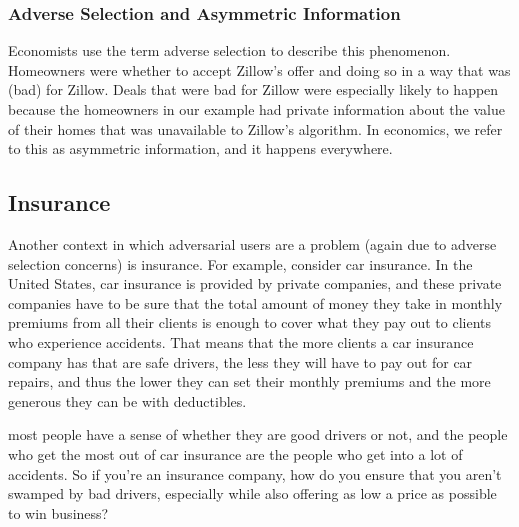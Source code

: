 \documentclass[letterpaper,10pt,english]{jupyterBook}
\begin{document}
\subsubsection{Adverse Selection and Asymmetric Information}
\label{\detokenize{30_questions/29_passive_external_adversarial_users_examples:adverse-selection-and-asymmetric-information}}
\sphinxAtStartPar
Economists use the term adverse selection to describe this phenomenon. Homeowners were  whether to accept Zillow’s offer and doing so in a way that was  (bad) for Zillow. Deals that were bad for Zillow were especially likely to happen because the homeowners in our example had private information about the value of their homes that was unavailable to Zillow’s algorithm. In economics, we refer to this as asymmetric information, and it happens everywhere.


\subsection{Insurance}
\label{\detokenize{30_questions/29_passive_external_adversarial_users_examples:insurance}}
\sphinxAtStartPar
Another context in which adversarial users are a problem (again due to adverse selection concerns) is insurance. For example, consider car insurance. In the United States, car insurance is provided by private companies, and these private companies have to be sure that the total amount of money they take in monthly premiums from all their clients is enough to cover what they pay out to clients who experience accidents. That means that the more clients a car insurance company has that are safe drivers, the less they will have to pay out for car repairs, and thus the lower they can set their monthly premiums and the more generous they can be with deductibles.

\sphinxAtStartPar
{} most people have a sense of whether they are good drivers or not, and the people who get the most out of car insurance are the people who get into a lot of accidents. So if you’re an insurance company, how do you ensure that you aren’t swamped by bad drivers, especially while also offering as low a price as possible to win business?
\end{document}
